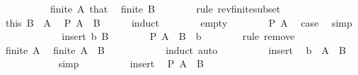 \begin{isabellebody}
\ \ \isamarkupfalse%
\ {\isacharminus}{\kern0pt}\isanewline
\ \ \ \ \isamarkupfalse%
\ {\isacartoucheopen}finite\ A{\isacartoucheclose}\ that\ \isamarkupfalse%
\ {\isachardoublequoteopen}finite\ B{\isachardoublequoteclose}\isanewline
\ \ \ \ \ \ \isamarkupfalse%
\ {\isacharparenleft}{\kern0pt}rule\ rev{\isacharunderscore}{\kern0pt}finite{\isacharunderscore}{\kern0pt}subset{\isacharparenright}{\kern0pt}\isanewline
\ \ \ \ \isamarkupfalse%
\ this\ {\isacartoucheopen}B\ {\isasymsubseteq}\ A{\isacartoucheclose}\ \isamarkupfalse%
\ {\isachardoublequoteopen}P\ {\isacharparenleft}{\kern0pt}A\ {\isacharminus}{\kern0pt}\ B{\isacharparenright}{\kern0pt}{\isachardoublequoteclose}\isanewline
\ \ \ \ \isamarkupfalse%
\ induct\isanewline
\ \ \ \ \ \ \isamarkupfalse%
\ empty\isanewline
\ \ \ \ \ \ \isamarkupfalse%
\ {\isacartoucheopen}P\ A{\isacartoucheclose}\ \isamarkupfalse%
\ {\isacharquery}{\kern0pt}case\ \isamarkupfalse%
\ simp\isanewline
\ \ \ \ \isamarkupfalse%
\isanewline
\ \ \ \ \ \ \isamarkupfalse%
\ {\isacharparenleft}{\kern0pt}insert\ b\ B{\isacharparenright}{\kern0pt}\isanewline
\ \ \ \ \ \ \isamarkupfalse%
\ {\isachardoublequoteopen}P\ {\isacharparenleft}{\kern0pt}A\ {\isacharminus}{\kern0pt}\ B\ {\isacharminus}{\kern0pt}\ {\isacharbraceleft}{\kern0pt}b{\isacharbraceright}{\kern0pt}{\isacharparenright}{\kern0pt}{\isachardoublequoteclose}\isanewline
\ \ \ \ \ \ \isamarkupfalse%
\ {\isacharparenleft}{\kern0pt}rule\ remove{\isacharparenright}{\kern0pt}\isanewline
\ \ \ \ \ \ \ \ \isamarkupfalse%
\ {\isacartoucheopen}finite\ A{\isacartoucheclose}\ \isamarkupfalse%
\ {\isachardoublequoteopen}finite\ {\isacharparenleft}{\kern0pt}A\ {\isacharminus}{\kern0pt}\ B{\isacharparenright}{\kern0pt}{\isachardoublequoteclose}\isanewline
\ \ \ \ \ \ \ \ \ \ \isamarkupfalse%
\ induct\ auto\isanewline
\ \ \ \ \ \ \ \ \isamarkupfalse%
\ insert\ \isamarkupfalse%
\ {\isachardoublequoteopen}b\ {\isasymin}\ A\ {\isacharminus}{\kern0pt}\ B{\isachardoublequoteclose}\isanewline
\ \ \ \ \ \ \ \ \ \ \isamarkupfalse%
\ simp\isanewline
\ \ \ \ \ \ \ \ \isamarkupfalse%
\ insert\ \isamarkupfalse%
\ {\isachardoublequoteopen}P\ {\isacharparenleft}{\kern0pt}A\ {\isacharminus}{\kern0pt}\ B{\isacharparenright}{\kern0pt}{\isachardoublequoteclose}\isanewline

\end{isabellebody}
